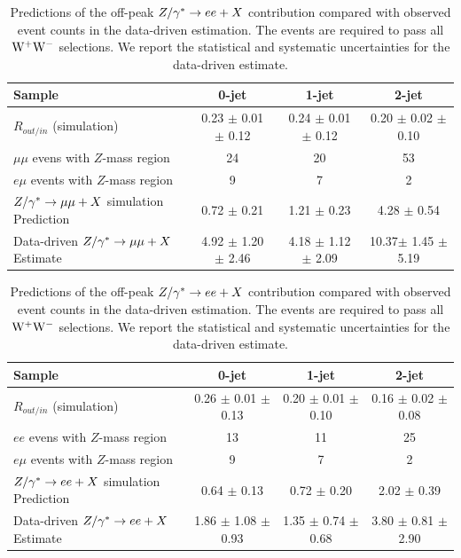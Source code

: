 \begin{table}
\begin{center}
\begin{tabular}{l c c c}
\hline
Sample                                 &   0-jet             & 1-jet & 2-jet        \\
\hline
$R_{out/in}$ (simulation)              &   0.23 $\pm$ 0.01 $\pm$ 0.12 & 0.24 $\pm$ 0.01 $\pm$ 0.12 & 0.20 $\pm$ 0.02 $\pm$ 0.10	\\
$\mu\mu$ evens with $Z$-mass region    &         24        	      &       20		   &	 53			\\
$e\mu$ events with $Z$-mass region     &          9        	      &        7		   &	  2			\\
$\dymm+X$ simulation Prediction        &   0.72 $\pm$ 0.21 	      & 1.21 $\pm$ 0.23 	   & 4.28 $\pm$ 0.54		\\
Data-driven $\dymm+X$ Estimate         &   4.92 $\pm$ 1.20 $\pm$ 2.46 & 4.18 $\pm$  1.12 $\pm$ 2.09& 10.37$\pm$ 1.45 $\pm$ 5.19 \\ 
\hline
\end{tabular}
\end{center}
\caption{Predictions of the off-peak $\dymm+X$ contribution compared 
with observed event counts in the data-driven estimation. The events are required to pass all 
$\mathrm{W}^+\mathrm{W}^-$ selections. We report the statistical and systematic uncertainties for the data-driven estimate.}
\label{tab:dyestmm}
\begin{center}
\begin{tabular}{l c c c}
\hline
Sample                                 &   0-jet             & 1-jet & 2-jet        \\
\hline
$R_{out/in}$ (simulation)              &   0.26 $\pm$ 0.01 $\pm$ 0.13 & 0.20 $\pm$ 0.01 $\pm$ 0.10 & 0.16 $\pm$ 0.02 $\pm$ 0.08	\\
$ee$ evens with $Z$-mass region        &         13        	      &       11		   &	 25			\\
$e\mu$ events with $Z$-mass region     &          9        	      &        7		   &	  2			\\
$Z/\gamma^*\to ee+X$ simulation Prediction        &   0.64 $\pm$ 0.13 	      & 0.72 $\pm$ 0.20 	   & 2.02 $\pm$ 0.39		\\
Data-driven $Z/\gamma^*\to ee+X$ Estimate         &   1.86 $\pm$ 1.08 $\pm$ 0.93 & 1.35 $\pm$  0.74 $\pm$ 0.68& 3.80 $\pm$ 0.81 $\pm$ 2.90 \\ 
\hline
\end{tabular}
\end{center}
\caption{Predictions of the off-peak $Z/\gamma^*\to ee+X$ contribution compared 
with observed event counts in the data-driven estimation. The events are required to pass all 
$\mathrm{W}^+\mathrm{W}^-$ selections. We report the statistical and systematic uncertainties for the data-driven estimate.}
\label{tab:dyestee}
\end{table}


